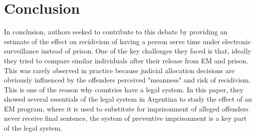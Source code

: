 \documentclass[a4paper,12pt]{article}
\begin{document}
\section{Conclusion}
In conclusion, authors seeked to contribute to this debate by providing an estimate of the effect on recidivism of having a person serve time under electronic surveillance instead of prison. One of the key challenges they faced is that, ideally they tried to compare similar individuals after their release from EM and prison. This was rarely observed in practice because judicial allocation decisions are obviously influenced by the offenders perceived "meanness" and risk of recidivism. This is one of the reason why countries have a legal system. In this paper, they showed several essentials of the legal system in Argentina to study the effect of an EM program, where it is used to substitute for imprisonment of alleged offenders never receive final sentence, the system of preventive imprisonment is a key part of the legal system. 




\newpage
\end{document}
